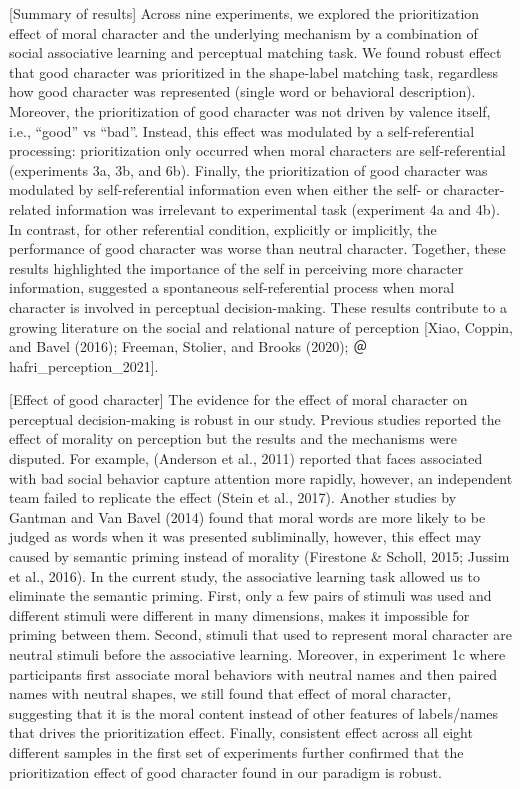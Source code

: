 \documentclass[
  man]{apa6}
\begin{document}
{[}Summary of results{]} Across nine experiments, we explored the prioritization effect of moral character and the underlying mechanism by a combination of social associative learning and perceptual matching task. We found robust effect that good character was prioritized in the shape-label matching task, regardless how good character was represented (single word or behavioral description). Moreover, the prioritization of good character was not driven by valence itself, i.e., ``good'' vs ``bad''. Instead, this effect was modulated by a self-referential processing: prioritization only occurred when moral characters are self-referential (experiments 3a, 3b, and 6b). Finally, the prioritization of good character was modulated by self-referential information even when either the self- or character- related information was irrelevant to experimental task (experiment 4a and 4b). In contrast, for other referential condition, explicitly or implicitly, the performance of good character was worse than neutral character. Together, these results highlighted the importance of the self in perceiving more character information, suggested a spontaneous self-referential process when moral character is involved in perceptual decision-making. These results contribute to a growing literature on the social and relational nature of perception {[}Xiao, Coppin, and Bavel (2016); Freeman, Stolier, and Brooks (2020); ＠hafri\_perception\_2021{]}.

{[}Effect of good character{]} The evidence for the effect of moral character on perceptual decision-making is robust in our study. Previous studies reported the effect of morality on perception but the results and the mechanisms were disputed. For example, (Anderson et al., 2011) reported that faces associated with bad social behavior capture attention more rapidly, however, an independent team failed to replicate the effect (Stein et al., 2017). Another studies by Gantman and Van Bavel (2014) found that moral words are more likely to be judged as words when it was presented subliminally, however, this effect may caused by semantic priming instead of morality (Firestone \& Scholl, 2015; Jussim et al., 2016). In the current study, the associative learning task allowed us to eliminate the semantic priming. First, only a few pairs of stimuli was used and different stimuli were different in many dimensions, makes it impossible for priming between them. Second, stimuli that used to represent moral character are neutral stimuli before the associative learning. Moreover, in experiment 1c where participants first associate moral behaviors with neutral names and then paired names with neutral shapes, we still found that effect of moral character, suggesting that it is the moral content instead of other features of labels/names that drives the prioritization effect. Finally, consistent effect across all eight different samples in the first set of experiments further confirmed that the prioritization effect of good character found in our paradigm is robust.
\end{document}
